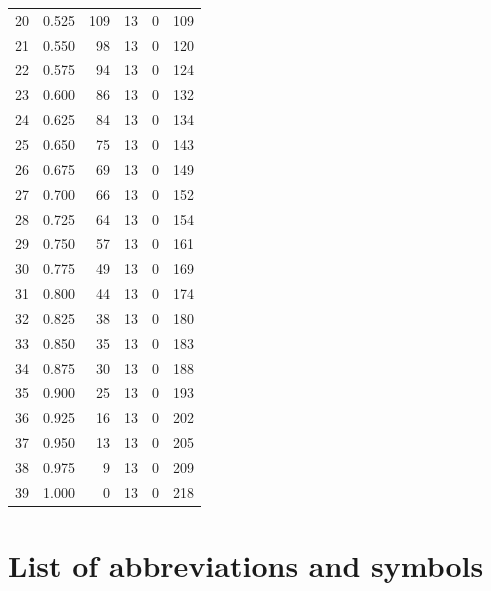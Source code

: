 \documentclass[a4paper,twoside,12pt]{book}
\begin{document}
\begin{appendices}
\begin{table}
\begin{tabular}{lrrrrr}
		20 &  0.525 &       109 &        13 &               0 &             109 \\
		21 &  0.550 &        98 &        13 &               0 &             120 \\
		22 &  0.575 &        94 &        13 &               0 &             124 \\
		23 &  0.600 &        86 &        13 &               0 &             132 \\
		24 &  0.625 &        84 &        13 &               0 &             134 \\
		25 &  0.650 &        75 &        13 &               0 &             143 \\
		26 &  0.675 &        69 &        13 &               0 &             149 \\
		27 &  0.700 &        66 &        13 &               0 &             152 \\
		28 &  0.725 &        64 &        13 &               0 &             154 \\
		29 &  0.750 &        57 &        13 &               0 &             161 \\
		30 &  0.775 &        49 &        13 &               0 &             169 \\
		31 &  0.800 &        44 &        13 &               0 &             174 \\
		32 &  0.825 &        38 &        13 &               0 &             180 \\
		33 &  0.850 &        35 &        13 &               0 &             183 \\
		34 &  0.875 &        30 &        13 &               0 &             188 \\
		35 &  0.900 &        25 &        13 &               0 &             193 \\
		36 &  0.925 &        16 &        13 &               0 &             202 \\
		37 &  0.950 &        13 &        13 &               0 &             205 \\
		38 &  0.975 &         9 &        13 &               0 &             209 \\
		39 &  1.000 &         0 &        13 &               0 &             218 \\
		\bottomrule
	\end{tabular}
\end{table} 

\chapter*{List of abbreviations and symbols}


\end{appendices}
\end{document}
